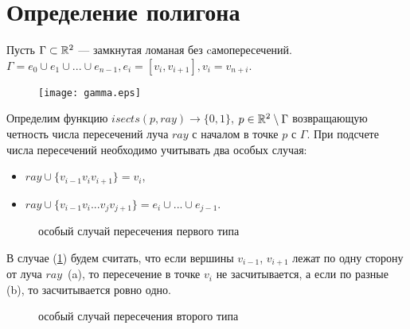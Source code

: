 \section{Определение полигона}

Пусть $\Gamma \subset \mathbb{R}^2$ --- замкнутая ломаная без cамопересечений. $\Gamma = e_0 \cup e_1 \cup ... \cup e_{n-1}, 
e_i = [v_i, v_{i+1}], v_i = v_{n + i}$.
\begin{figure}[h]
\texttt{[image: gamma.eps]}
\end{figure}
Определим функцию $isects(p, ray) \to \{0, 1\}$, $p \in \mathbb{R}^2 \setminus \Gamma$ возвращающую четность числа пересечений 
луча $ray$ с началом в точке $p$ с $\Gamma$. При подсчете числа пересечений необходимо учитывать два особых случая: 
\begin{itemize}
    \item $ray \cup \{v_{i-1}v_{i}v_{i+1}\} = v_i$, 
    \item $ray \cup \{v_{i-1}v_{i}...v_{j}v_{j+1}\} = e_{i} \cup ... \cup e_{j-1}$. 
\end{itemize}

\begin{figure}[h]
\begin{minipage}[h]{0.49\linewidth}
\end{minipage}
\hfill
\begin{minipage}[h]{0.49\linewidth}
\end{minipage}
\caption{особый случай пересечения первого типа}
\label{pic:isect_1}
\end{figure}

В случае (\ref{pic:isect_1}) будем считать, что если вершины $v_{i-1}$, $v_{i+1}$ лежат по одну сторону от луча $ray$~(a), 
то пересечение в точке $v_i$ не засчитывается, а если по разные (b), то засчитывается ровно одно.

\begin{figure}[h]
\begin{minipage}[h]{0.49\linewidth}
\end{minipage}
\hfill
\begin{minipage}[h]{0.49\linewidth}
\end{minipage}
\caption{особый случай пересечения второго типа}
\label{pic:isect_2}
\end{figure}

